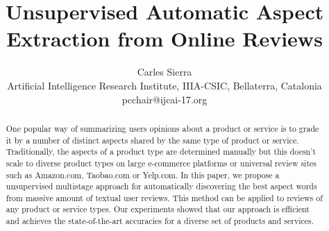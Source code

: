 \documentclass{article}
\title{Unsupervised Automatic Aspect Extraction from Online Reviews}
\author{Carles Sierra\\ 
Artificial Intelligence Research Institute, IIIA-CSIC, Bellaterra, Catalonia  \\
pcchair@ijcai-17.org}
\begin{document}
\maketitle

\begin{abstract}
One popular way of summarizing users opinions about a product or
service is to grade it by a number of distinct aspects 
shared by the same type of product or service.
Traditionally, the aspects of a product type are determined manually
but this doesn't scale to diverse product types on large
e-commerce platforms or universal review sites such as Amazon.com, Taobao.com
or Yelp.com.
In this paper, we propose a unsupervised multistage 
approach for automatically discovering the best aspect words from massive
amount of textual user reviews. This method can be applied to reviews of
any product or service types. Our experiments showed that our approach
is efficient and achieves the state-of-the-art accuracies for a diverse
set of products and services. 
\end{abstract}




%
%



\end{document}
